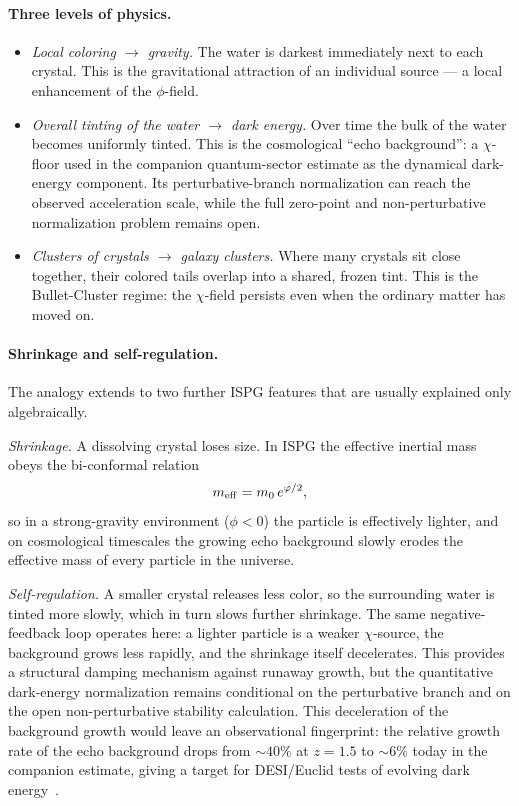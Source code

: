 \documentclass[11pt]{article}
\begin{document}
\paragraph{Three levels of physics.}
\begin{itemize}
\item \emph{Local coloring $\rightarrow$ gravity.} The water is darkest immediately next to each crystal. This is the gravitational attraction of an individual source --- a local enhancement of the $\phi$-field.
\item \emph{Overall tinting of the water $\rightarrow$ dark energy.} Over time the bulk of the water becomes uniformly tinted. This is the cosmological ``echo background'': a $\chi$-floor used in the companion quantum-sector estimate as the dynamical dark-energy component. Its perturbative-branch normalization can reach the observed acceleration scale, while the full zero-point and non-perturbative normalization problem remains open.
\item \emph{Clusters of crystals $\rightarrow$ galaxy clusters.} Where many crystals sit close together, their colored tails overlap into a shared, frozen tint. This is the Bullet-Cluster regime: the $\chi$-field persists even when the ordinary matter has moved on.
\end{itemize}

\paragraph{Shrinkage and self-regulation.}
The analogy extends to two further ISPG features that are usually explained only algebraically.

\emph{Shrinkage.} A dissolving crystal loses size. In ISPG the effective inertial mass obeys the bi-conformal relation
\begin{equation}
m_{\rm eff} = m_0\, e^{\phi/2},
\label{eq:meff_crystal}
\end{equation}
so in a strong-gravity environment ($\phi<0$) the particle is effectively lighter, and on cosmological timescales the growing echo background slowly erodes the effective mass of every particle in the universe.

\emph{Self-regulation.} A smaller crystal releases less color, so the surrounding water is tinted more slowly, which in turn slows further shrinkage. The same negative-feedback loop operates here: a lighter particle is a weaker $\chi$-source, the background grows less rapidly, and the shrinkage itself decelerates. This provides a structural damping mechanism against runaway growth, but the quantitative dark-energy normalization remains conditional on the perturbative branch and on the open non-perturbative stability calculation. This deceleration of the background growth would leave an observational fingerprint: the relative growth rate of the echo background drops from ${\sim}40\%$ at $z=1.5$ to ${\sim}6\%$ today in the companion estimate, giving a target for DESI/Euclid tests of evolving dark energy~\cite{DESIDR2}.
\end{document}
